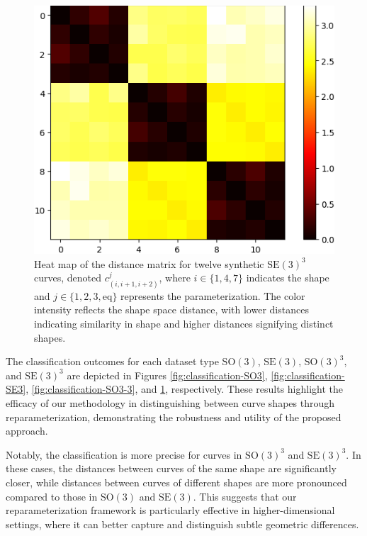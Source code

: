 \begin{figure}
    \centering
    \includegraphics[width=0.7\linewidth]{figures/syntetic_data/distance_matrix/SE3_3.png}
    \caption[Classification using reparameterization of curves in \(\mathrm{SE}(3)^3\)]{Heat map of the distance matrix for twelve synthetic \(\mathrm{SE}(3)^3\) curves, denoted \(c_{(i,i+1,i+2)}^j\), where \(i \in \{1, 4, 7\}\) indicates the shape and \(j \in \{1, 2, 3, \text{eq}\}\) represents the parameterization. The color intensity reflects the shape space distance, with lower distances indicating similarity in shape and higher distances signifying distinct shapes.}
    \label{fig:classification-SE3-3}
\end{figure}

The classification outcomes for each dataset type \(\mathrm{SO}(3)\), \(\mathrm{SE}(3)\), \(\mathrm{SO}(3)^3\), and \(\mathrm{SE}(3)^3\) are depicted in Figures \ref{fig:classification-SO3}, \ref{fig:classification-SE3}, \ref{fig:classification-SO3-3}, and \ref{fig:classification-SE3-3}, respectively. These results highlight the efficacy of our methodology in distinguishing between curve shapes through reparameterization, demonstrating the robustness and utility of the proposed approach.

Notably, the classification is more precise for curves in \(\mathrm{SO}(3)^3\) and \(\mathrm{SE}(3)^3\). In these cases, the distances between curves of the same shape are significantly closer, while distances between curves of different shapes are more pronounced compared to those in \(\mathrm{SO}(3)\) and \(\mathrm{SE}(3)\). This suggests that our reparameterization framework is particularly effective in higher-dimensional settings, where it can better capture and distinguish subtle geometric differences.

\FloatBarrier
